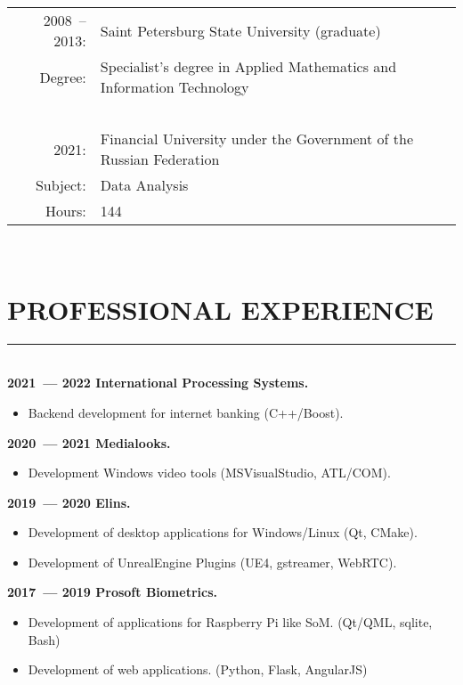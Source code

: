 \documentclass[a4paper,oneside,12pt]{article}
\newcommand{\cvpart}[1]{%
\vspace{-1em}%
\section*{\Large\bfseries\MakeTextUppercase{#1}}%
\vspace{-1em}%
\rule{\linewidth}{0.3em}\\[-.3em]%
}
\begin{document}
\begin{tabularx}{\textwidth}{rX}
  2008~-- 2013:& Saint Petersburg State University (graduate)\\
        Degree:& Specialist's degree in Applied Mathematics and Information Technology\\  
    &~\\[.5em]
          2021:& Financial University under the Government of the Russian Federation  \\
       Subject:& Data Analysis \\ 
         Hours:& 144
\end{tabularx}

~\\

\cvpart{Professional Experience}

%
{\bf
2021~--- 2022 International Processing Systems.
}
\begin{itemize}
    \item Backend  development for internet banking (C++/Boost).
\end{itemize}

{\bf
2020~--- 2021 Medialooks.
}
\begin{itemize}
    \item Development Windows video tools (MSVisualStudio, ATL/COM).
\end{itemize}

{\bf
2019~--- 2020 Elins.
}
\begin{itemize}
    \item Development of desktop applications for Windows/Linux (Qt, CMake).
    \item Development of UnrealEngine Plugins (UE4, gstreamer, WebRTC).
\end{itemize}

{\bf
2017~--- 2019 Prosoft Biometrics.
}
\begin{itemize}
    \item Development of applications for Raspberry Pi like SoM. (Qt/QML, sqlite, Bash)
    \item Development of web applications. (Python, Flask, AngularJS)
\end{itemize}
\end{document}
